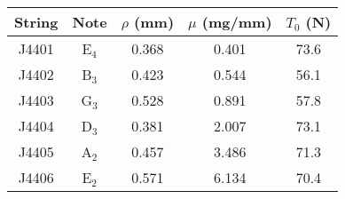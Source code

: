 \begin{tabular}{ccccc}
\toprule
String & Note & $\rho$ (mm) & $\mu$ (mg/mm) & $T_0$ (N) \\
\midrule
J4401 & E$_{4}$ & 0.368 & 0.401 & 73.6 \\
J4402 & B$_{3}$ & 0.423 & 0.544 & 56.1 \\
J4403 & G$_{3}$ & 0.528 & 0.891 & 57.8 \\
J4404 & D$_{3}$ & 0.381 & 2.007 & 73.1 \\
J4405 & A$_{2}$ & 0.457 & 3.486 & 71.3 \\
J4406 & E$_{2}$ & 0.571 & 6.134 & 70.4 \\
\bottomrule
\end{tabular}
